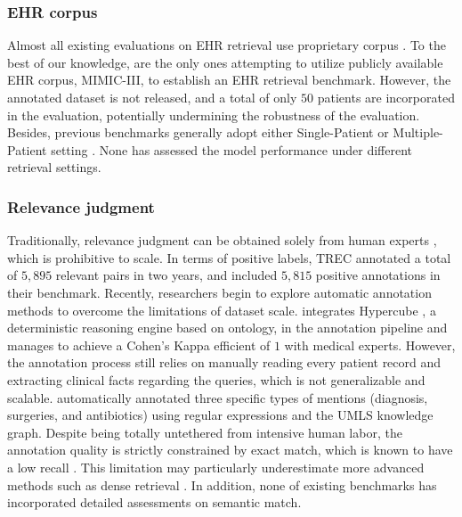 \subsubsection{EHR corpus}
Almost all existing evaluations on EHR retrieval use proprietary corpus \cite{trecmedicalrecord, Wang2019TestCF, Thai2024ACRAB}.
To the best of our knowledge, \citet{Myers2024LessonsLO} are the only ones attempting to utilize publicly available EHR corpus, MIMIC-III, to establish an EHR retrieval benchmark.
However, the annotated dataset is not released, and a total of only $50$ patients are incorporated in the evaluation, potentially undermining the robustness of the evaluation.
Besides, previous benchmarks generally adopt either Single-Patient \cite{ye2018extracting, ye2021leveraging, gupta2024oncoretrievergenerativeclassifierretrieval} or Multiple-Patient setting \cite{trecmedicalrecord, Wang2019TestCF, Thai2024ACRAB}.
None has assessed the model performance under different retrieval settings.

\subsubsection{Relevance judgment}
Traditionally, relevance judgment can be obtained solely from human experts \cite{trecmedicalrecord, Wang2019TestCF, Yu2022BIOSAA}, which is prohibitive to scale.
In terms of positive labels, TREC annotated a total of $5,895$ relevant pairs in two years, and \citet{Wang2019TestCF} included $5,815$ positive annotations in their benchmark.
Recently, researchers begin to explore automatic annotation methods to overcome the limitations of dataset scale.
\citet{Thai2024ACRAB} integrates Hypercube \cite{Shekhar2023CouplingSR}, a deterministic reasoning engine based on ontology, in the annotation pipeline and manages to achieve a Cohen's Kappa efficient of $1$ with medical experts.
However, the annotation process still relies on manually reading every patient record and extracting clinical facts regarding the queries, which is not generalizable and scalable.
\citet{Myers2024LessonsLO} automatically annotated three specific types of mentions (diagnosis, surgeries, and antibiotics) using regular expressions and the UMLS knowledge graph.
Despite being totally untethered from intensive human labor, the annotation quality is strictly constrained by exact match, which is known to have a low recall \cite{koopman2016information}.
This limitation may particularly underestimate more advanced methods such as dense retrieval \cite{thakur2021beir}.
In addition, none of existing benchmarks has incorporated detailed assessments on semantic match.


